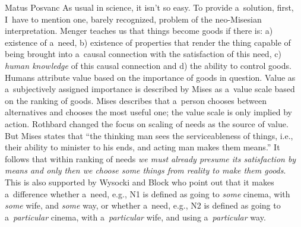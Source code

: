 \begin{artengenv}{Matus Posvanc}
As usual in science, it isn't so easy. To provide a~solution, first, I~have to mention one, barely recognized, problem of the neo-Misesian interpretation. Menger 
\parencite*[][p.52]{Menger2007Principles} %
 teaches us that things become goods if there is: a) existence of a~need, b) existence of properties that render the thing capable of being brought into a~causal connection with the satisfaction of this need, c) \textit{human knowledge} of this causal connection and d) the ability to control goods. Humans attribute value based on the importance of goods in question. Value as a~subjectively assigned importance is described by Mises
\parencite*[][p.160]{Mises2014Theory} %
 as a~value scale based on the ranking of goods. Mises 
\parencite*[][pp.94–95]{Mises1998Human} %
 describes that a~person chooses between alternatives and chooses the most useful one; the value scale is only implied by action. Rothbard changed the focus on scaling of needs as the source of value. But Mises 
\parencite*[][p.92]{Mises1998Human} %
 states that ``the thinking man sees the serviceableness of things, i.e., their ability to minister to his ends, and acting man makes them means.'' It follows that within ranking of needs \textit{we must already presume its satisfaction by means and only then we choose some things from reality to make them goods}. This is also supported by Wysocki and Block 
\parencite*[][]{Wysocki2019Homogeneity} %
 who point out that it makes a~difference whether a~need, e.g., N1 is defined as going to \textit{some} cinema, with \textit{some} wife, and \textit{some} way, or whether a~need, e.g., N2 is defined as going to a~\textit{particular} cinema, with a~\textit{particular} wife, and using a~\textit{particular} way.




\end{artengenv}
